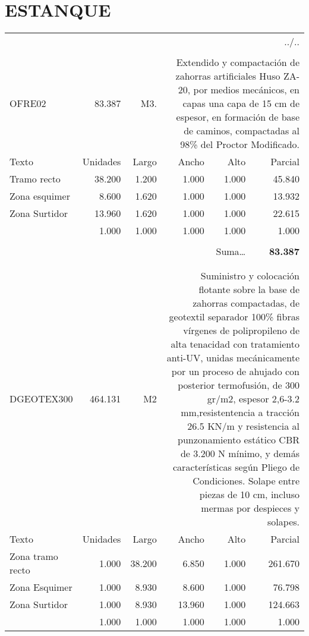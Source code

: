 \documentclass{book}%
\begin{document}
\section{ESTANQUE}%
\label{sec:ESTANQUE}%
\begin{longtable}{lrrrrr}%
\multicolumn{6}{r}{../..}\\%
\endfoot%
\endlastfoot%
&&&&&\\%
OFRE02&83.387& M3.&\multicolumn{3}{p{6cm}}{\scriptsize Extendido y compactación de zahorras artificiales Huso ZA-20, por medios mecánicos, en capas una capa de 15 cm de espesor, en formación de base de caminos, compactadas al 98\% del Proctor Modificado.\normalsize}\\%
Texto&Unidades&Largo&Ancho&Alto&Parcial\\%
\hline%
\multicolumn{1}{p{3.5cm}}{Tramo recto}&38.200&1.200&1.000&1.000&45.840\\%
\multicolumn{1}{p{3.5cm}}{Zona esquimer}&8.600&1.620&1.000&1.000&13.932\\%
\multicolumn{1}{p{3.5cm}}{Zona Surtidor}&13.960&1.620&1.000&1.000&22.615\\%
\multicolumn{1}{p{3.5cm}}{}&1.000&1.000&1.000&1.000&1.000\\%
&&&&&\\%
\multicolumn{5}{r}{Suma\ldots}&\textbf{83.387}\\%
\hline%
&&&&&\\%
&&&&&\\%
DGEOTEX300&464.131& M2&\multicolumn{3}{p{6cm}}{\scriptsize Suministro y colocación flotante sobre la base de zahorras compactadas, de geotextil separador 100\% fibras vírgenes de polipropileno de alta tenacidad con tratamiento anti-UV, unidas mecánicamente por un  proceso de ahujado con posterior termofusión, de 300 gr/m2, espesor 2,6-3.2 mm,resistentencia a tracción 26.5 KN/m y resistencia al punzonamiento estático CBR de 3.200 N mínimo, y demás características según Pliego de Condiciones. Solape entre piezas de 10 cm, incluso mermas por despieces y solapes.\normalsize}\\%
Texto&Unidades&Largo&Ancho&Alto&Parcial\\%
\hline%
\multicolumn{1}{p{3.5cm}}{Zona tramo recto}&1.000&38.200&6.850&1.000&261.670\\%
\multicolumn{1}{p{3.5cm}}{Zona Esquimer}&1.000&8.930&8.600&1.000&76.798\\%
\multicolumn{1}{p{3.5cm}}{Zona Surtidor}&1.000&8.930&13.960&1.000&124.663\\%
\multicolumn{1}{p{3.5cm}}{}&1.000&1.000&1.000&1.000&1.000\\%

\end{longtable}
\end{document}

